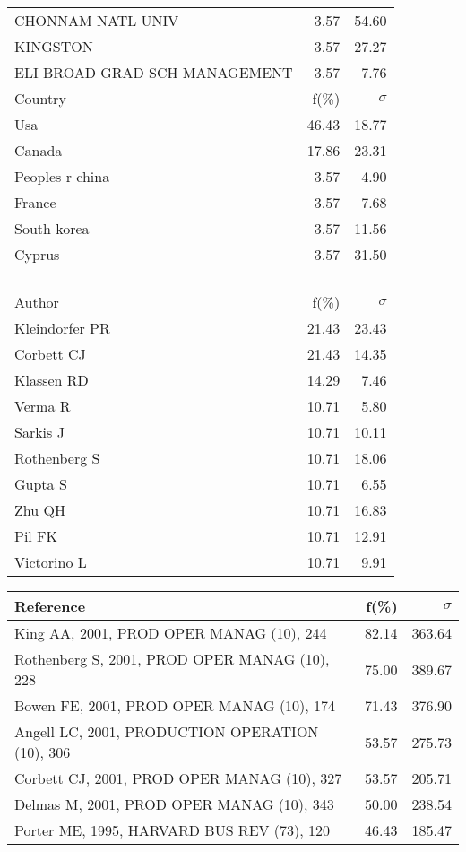 \documentclass[a4paper,11pt]{report}
\begin{document}
\begin{landscape}
\begin{table}[!ht]
{\begin{tabular}{|l r r|}
CHONNAM NATL UNIV & 3.57 & 54.60\\
KINGSTON & 3.57 & 27.27\\
ELI BROAD GRAD SCH MANAGEMENT & 3.57 & 7.76\\
\hline
\hline
Country & f(\%) & $\sigma$\\
\hline
Usa & 46.43 & 18.77\\
Canada & 17.86 & 23.31\\
Peoples r china & 3.57 & 4.90\\
France & 3.57 & 7.68\\
South korea & 3.57 & 11.56\\
Cyprus & 3.57 & 31.50\\
 &  & \\
 &  & \\
 &  & \\
 &  & \\
\hline
\hline
Author & f(\%) & $\sigma$\\
\hline
Kleindorfer PR & 21.43 & 23.43\\
Corbett CJ & 21.43 & 14.35\\
Klassen RD & 14.29 & 7.46\\
Verma R & 10.71 & 5.80\\
Sarkis J & 10.71 & 10.11\\
Rothenberg S & 10.71 & 18.06\\
Gupta S & 10.71 & 6.55\\
Zhu QH & 10.71 & 16.83\\
Pil FK & 10.71 & 12.91\\
Victorino L & 10.71 & 9.91\\
\hline
\end{tabular}
}
{\scriptsize\begin{tabular}{|l r r|}
\hline
Reference & f(\%) & $\sigma$\\
\hline
King AA, 2001, PROD OPER MANAG (10), 244 & 82.14 & 363.64\\
Rothenberg S, 2001, PROD OPER MANAG (10), 228 & 75.00 & 389.67\\
Bowen FE, 2001, PROD OPER MANAG (10), 174 & 71.43 & 376.90\\
Angell LC, 2001, PRODUCTION OPERATION (10), 306 & 53.57 & 275.73\\
Corbett CJ, 2001, PROD OPER MANAG (10), 327 & 53.57 & 205.71\\
Delmas M, 2001, PROD OPER MANAG (10), 343 & 50.00 & 238.54\\
Porter ME, 1995, HARVARD BUS REV (73), 120 & 46.43 & 185.47\\

\end{tabular}}
\end{table}
\end{landscape}
\end{document}
